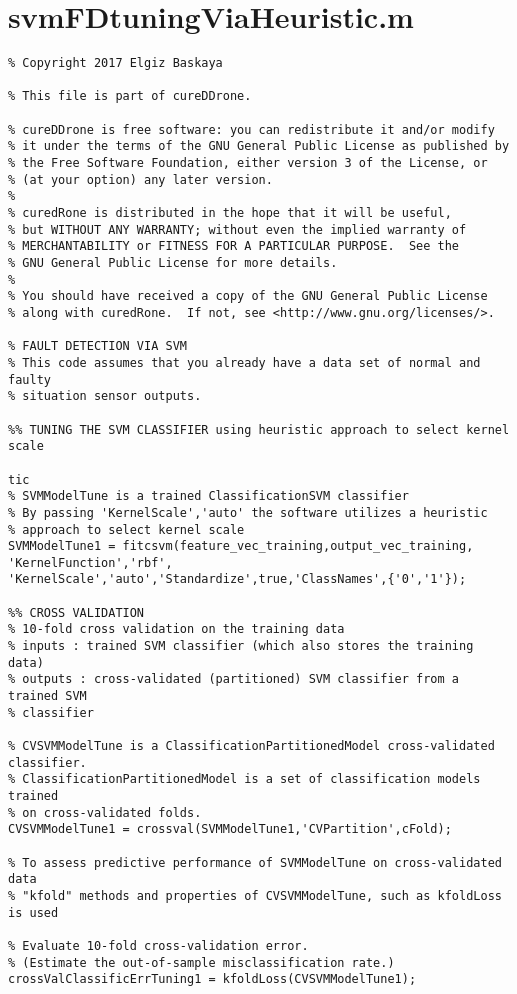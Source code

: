  \section{svmFDtuningViaHeuristic.m}
\begin{lstlisting}
% Copyright 2017 Elgiz Baskaya

% This file is part of cureDDrone.

% cureDDrone is free software: you can redistribute it and/or modify
% it under the terms of the GNU General Public License as published by
% the Free Software Foundation, either version 3 of the License, or
% (at your option) any later version.
% 
% curedRone is distributed in the hope that it will be useful,
% but WITHOUT ANY WARRANTY; without even the implied warranty of
% MERCHANTABILITY or FITNESS FOR A PARTICULAR PURPOSE.  See the
% GNU General Public License for more details.
% 
% You should have received a copy of the GNU General Public License
% along with curedRone.  If not, see <http://www.gnu.org/licenses/>.

% FAULT DETECTION VIA SVM
% This code assumes that you already have a data set of normal and faulty 
% situation sensor outputs.

%% TUNING THE SVM CLASSIFIER using heuristic approach to select kernel scale

tic
% SVMModelTune is a trained ClassificationSVM classifier 
% By passing 'KernelScale','auto' the software utilizes a heuristic
% approach to select kernel scale
SVMModelTune1 = fitcsvm(feature_vec_training,output_vec_training, 'KernelFunction','rbf', 'KernelScale','auto','Standardize',true,'ClassNames',{'0','1'});

%% CROSS VALIDATION
% 10-fold cross validation on the training data
% inputs : trained SVM classifier (which also stores the training data)
% outputs : cross-validated (partitioned) SVM classifier from a trained SVM
% classifier

% CVSVMModelTune is a ClassificationPartitionedModel cross-validated classifier.
% ClassificationPartitionedModel is a set of classification models trained 
% on cross-validated folds.
CVSVMModelTune1 = crossval(SVMModelTune1,'CVPartition',cFold);

% To assess predictive performance of SVMModelTune on cross-validated data 
% "kfold" methods and properties of CVSVMModelTune, such as kfoldLoss is used

% Evaluate 10-fold cross-validation error.
% (Estimate the out-of-sample misclassification rate.)
crossValClassificErrTuning1 = kfoldLoss(CVSVMModelTune1);


\end{lstlisting}
